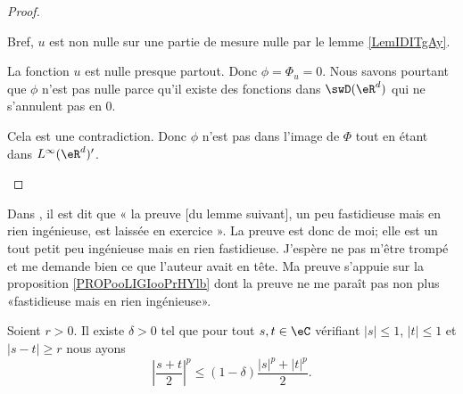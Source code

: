 \begin{proof}
\begin{subproof}
    Bref, \( u\) est non nulle sur une partie de mesure nulle par le lemme \ref{LemIDITgAy}.

    \spitem[Conclusion]

    La fonction \( u\) est nulle presque partout. Donc \( \phi=\Phi_u=0\). Nous savons pourtant que \( \phi\) n'est pas nulle parce qu'il existe des fonctions dans \( \swD(\eR^d)\) qui ne s'annulent pas en \( 0\).

    Cela est une contradiction. Donc \( \phi\) n'est pas dans l'image de \( \Phi\) tout en étant dans \( L^{\infty}(\eR^d)'\).

\end{subproof}
\end{proof}

Dans \cite{ooHGADooNGZnbt}, il est dit que « la preuve [du lemme suivant], un peu fastidieuse mais en rien ingénieuse, est laissée en exercice ». La preuve est donc de moi; elle est un tout petit peu ingénieuse mais en rien fastidieuse. J'espère ne pas m'être trompé et me demande bien ce que l'auteur avait en tête. Ma preuve s'appuie sur la proposition \ref{PROPooLIGIooPrHYlb} dont la preuve ne me paraît pas non plus «fastidieuse mais en rien ingénieuse».

\begin{lemma}        \label{LEMooLDQRooEGWDlm}
Soient \( r>0\). Il existe \( \delta>0\) tel que pour tout \( s,t\in \eC\) vérifiant \( | s |\leq 1\), \( | t |\leq 1\) et \( | s-t |\geq r\) nous ayons
\begin{equation}
    \left| \frac{ s+t }{ 2 } \right|^p\leq (1-\delta)\frac{ | s |^p+| t |^p }{2}.
\end{equation}
\end{lemma}

